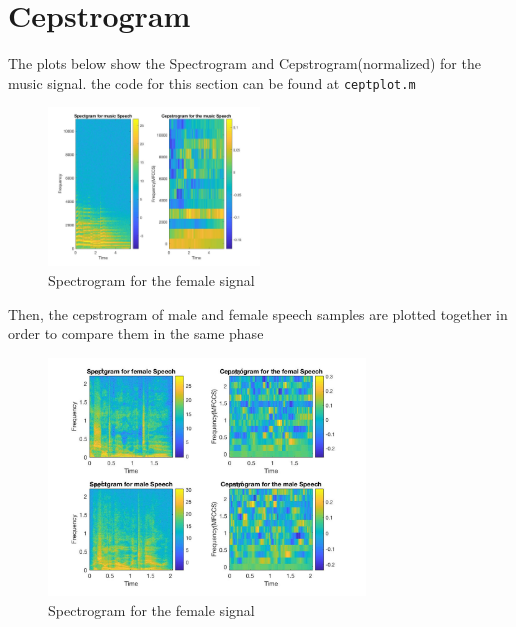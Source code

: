 \documentclass{article}
\begin{document}
    \section{Cepstrogram}
    The plots below show the Spectrogram and Cepstrogram(normalized) for the music signal. the code for this section can be found at \texttt{ceptplot.m}
    \begin{figure}[H]
        \begin{center}
            \leavevmode
            \includegraphics[width=0.5\textwidth]{cept_music.jpg}
        \end{center}
        \caption{Spectrogram for the female signal}
        \label{euler:1}
    \end{figure}
    Then, the cepstrogram of male and female speech samples are plotted together in order to compare them in the same phase
    \begin{figure}[H]
        \begin{center}
            \leavevmode
            \includegraphics[width=0.75\textwidth]{cept_male_female.jpg}
        \end{center}
        \caption{Spectrogram for the female signal}
    \end{figure}
    \newpage
\end{document}
